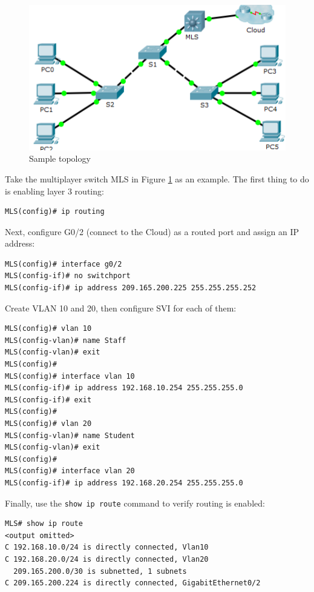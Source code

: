 \begin{figure}[hbtp]
\caption{Sample topology}\label{Layer3topology}
\centering
\includegraphics[scale=0.6]{pictures/Layer3topology.PNG}
\end{figure}

Take the multiplayer switch MLS in Figure \ref{Layer3topology} as an example. The first thing to do is enabling layer 3 routing:

\begin{verbatim}
MLS(config)# ip routing
\end{verbatim}

Next, configure G0/2 (connect to the Cloud) as a routed port and assign an IP address:

\begin{verbatim}
MLS(config)# interface g0/2
MLS(config-if)# no switchport
MLS(config-if)# ip address 209.165.200.225 255.255.255.252
\end{verbatim}

Create VLAN 10 and 20, then configure SVI for each of them:

\begin{verbatim}
MLS(config)# vlan 10
MLS(config-vlan)# name Staff
MLS(config-vlan)# exit
MLS(config)# 
MLS(config)# interface vlan 10
MLS(config-if)# ip address 192.168.10.254 255.255.255.0
MLS(config-if)# exit
MLS(config)# 
MLS(config)# vlan 20
MLS(config-vlan)# name Student
MLS(config-vlan)# exit
MLS(config)# 
MLS(config)# interface vlan 20
MLS(config-if)# ip address 192.168.20.254 255.255.255.0
\end{verbatim}

Finally, use the \verb|show ip route| command to verify routing is enabled:

\begin{verbatim}
MLS# show ip route
<output omitted>
C 192.168.10.0/24 is directly connected, Vlan10
C 192.168.20.0/24 is directly connected, Vlan20
  209.165.200.0/30 is subnetted, 1 subnets
C 209.165.200.224 is directly connected, GigabitEthernet0/2
\end{verbatim}